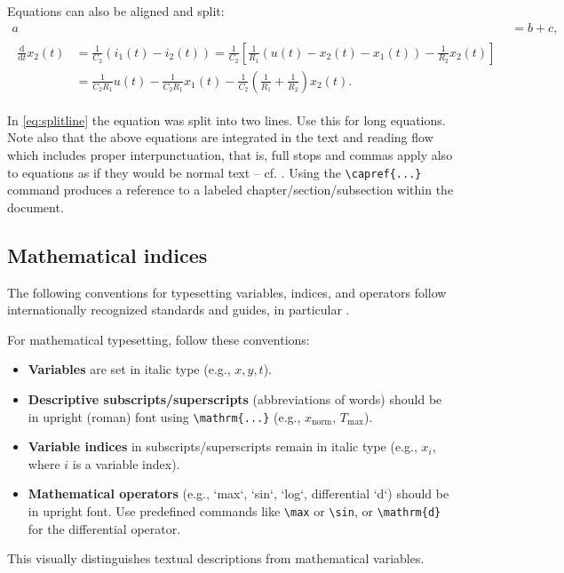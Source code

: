 Equations can also be aligned and split:
\begin{align}
    a&=b+c,\\
    \begin{split}
        \frac{\mathrm{d}}{\mathrm{d}t}x_2(t)&= \frac{1}{C_2} \left( i_1(t)-i_2(t)\right)= \frac{1}{C_2} \left[ \frac{1}{R_1} \left(u(t)-x_2(t)-x_1(t) \right)-\frac{1}{R_2} x_2(t)\right]\\
        &= \frac{1}{C_2 R_1} u(t)-\frac{1}{C_2 R_1} x_1(t) - \frac{1}{C_2} \left( \frac{1}{R_1}+\frac{1}{R_2}\right) x_2(t). 
        \label{eq:splitline}
    \end{split}
\end{align}

In \eqref{eq:splitline} the equation was split into two lines. Use this for long equations. Note also that the above equations are integrated in the text and reading flow which includes proper interpunctuation, that is, full stops and commas apply also to equations as if they would be normal text -- cf. . Using the \verb|\capref{...}| command produces a reference to a labeled chapter/section/subsection within the document.

\subsection{Mathematical indices}

The following conventions for typesetting variables, indices, and operators follow internationally recognized standards and guides, in particular \cite{ISO80000-2-2019,NIST-SP-811}.

\begin{infobox}
For mathematical typesetting, follow these conventions:

\begin{itemize}
	\item \textbf{Variables} are set in italic type (e.g., $x, y, t$).
	\item \textbf{Descriptive subscripts/superscripts} (abbreviations of words) should be in upright (roman) font using \verb|\mathrm{...}| (e.g., $x_\mathrm{norm}$, $T_\mathrm{max}$).
	\item \textbf{Variable indices} in subscripts/superscripts remain in italic type (e.g., $x_i$, where $i$ is a variable index).
	\item \textbf{Mathematical operators} (e.g., `max`, `sin`, `log`, differential `d`) should be in upright font. Use predefined commands like \verb|\max| or \verb|\sin|, or \verb|\mathrm{d}| for the differential operator.
\end{itemize}
This visually distinguishes textual descriptions from mathematical variables.
\end{infobox}

